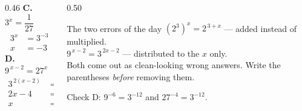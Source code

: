 \documentclass[aspectratio=169, 11pt]{beamer}
\begin{document}
\begin{frame}[t, plain]
  \begin{columns}[T]
    \begin{column}{0.46\textwidth}
      \footnotesize
      \textbf{C.} \; $3^{x}=\dfrac{1}{27}$
      \begin{align*}
        3^{x} &= 3^{-3} \\
        x &= -3
      \end{align*}
      \vspace{2pt}
      \textbf{D.} \; $9^{\,x-2}=27^{x}$
      \begin{align*}
        3^{\,2(x-2)} &= 3^{\,3x} \\
        2x-4 &= 3x \\
        x &= -4
      \end{align*}
    \end{column}
    \begin{column}{0.50\textwidth}
      \begin{block}{The two errors of the day}
        \footnotesize
        $\left(2^{3}\right)^{x}=2^{\,3+x}$ \; --- added instead of multiplied. \\[4pt]
        $9^{\,x-2}=3^{\,2x-2}$ \; --- distributed to the $x$ only. \\[6pt]
        Both come out as clean-looking wrong answers. Write the parentheses \emph{before} removing
        them.
      \end{block}
      \vspace{4pt}
      {\footnotesize Check D: $9^{-6}=3^{-12}$ and $27^{-4}=3^{-12}$. \checkmark}
    \end{column}
  \end{columns}
\end{frame}
\end{document}
